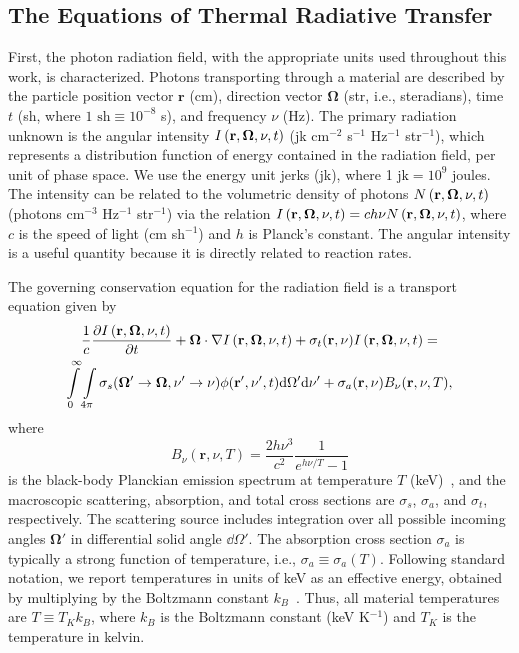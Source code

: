 \subsection{The Equations of Thermal Radiative Transfer}

First, the photon radiation field, with the appropriate units used throughout this work, is
characterized.  Photons transporting through a material are described by the particle position vector
$\mathbf{r}$ (cm), direction vector $\mathbf\Omega$ (str, i.e., steradians),
time $t$ (sh, where $1\text{ sh}\equiv10^{-8}$ s), and frequency $\nu$ (Hz).  The primary
radiation unknown is the angular intensity $I \left(\mathbf{r},\mathbf{\Omega},\nu,t\right)$ (jk cm$^{-2}$ s$^{-1}$
Hz$^{-1}$ str$^{-1}$), which represents a distribution
function of energy
contained in the radiation field, per unit of
phase space.  We use the energy unit jerks (jk), where 1 $\text{jk}= 10^9$ joules. The intensity can be related to the volumetric density of photons
$N \left(\mathbf{r},\mathbf{\Omega},\nu,t\right)$ (photons cm$^{-3}$ Hz$^{-1}$ str$^{-1}$) via the relation  $I\left(\mathbf{r},\mathbf{\Omega},\nu,t\right) =
c h \nu N \left(\mathbf{r},\mathbf{\Omega},\nu,t\right)$, where $c$ is the speed of light (cm sh$^{-1}$) and $h$ is Planck's constant. The
angular intensity is a useful quantity because it is directly related to reaction rates.

The governing conservation equation for the radiation field is a transport equation given
by~\cite{mihalas,lewis,wollaber_thesis}
 \begin{multline}
     \frac{1}{c} \frac{\partial I\left(\mathbf{r},\mathbf{\Omega},\nu,t\right)}{\partial t} + \mathbf{\Omega}\cdot \nabla I \left(\mathbf{r},\mathbf{\Omega},\nu,t\right) + \sigma_t
     (\mathbf{r},\nu) I \left(\mathbf{r},\mathbf{\Omega},\nu,t\right) = \\ \int \limits_0^\infty \int \limits_{4\pi}
     \sigma_s(\mathbf{\Omega'} \rightarrow \mathbf{\Omega},\nu'\rightarrow\nu)
     \phi(\mathbf{r}',\nu',t) \mathrm{d} \Omega' \mathrm{d} \nu' +
     \sigma_a(\mathbf{r},\nu)B_\nu(\mathbf{r},\nu,T),
 \end{multline}
where
\begin{equation}
    B_\nu(\mathbf{r},\nu,T) = \frac{2 h \nu^3}{c^2} \frac{1}{e^{h\nu/T} - 1}
\end{equation}
is the black-body Planckian emission
spectrum at temperature $T$ (keV)~\cite{mihalas}, and the macroscopic scattering, absorption, and total cross sections are $\sigma_s$,
$\sigma_a$, and $\sigma_t$, respectively. 
 The scattering source includes
integration over all possible incoming angles $\mathbf\Omega'$ in differential
solid angle $\dd \Omega'$.  The absorption cross section $\sigma_a$ is typically
a strong function of temperature, i.e., $\sigma_a\equiv \sigma_a(T)$.  Following standard notation, we
report temperatures in units of keV as an effective energy, obtained by multiplying by the Boltzmann
constant $k_B$~\cite{mihalas}.  Thus, all material temperatures are $T \equiv T_{K}
k_B$, where $k_B$ is the Boltzmann constant (keV K$^{-1}$) and $T_{K}$ is the temperature
in kelvin.

